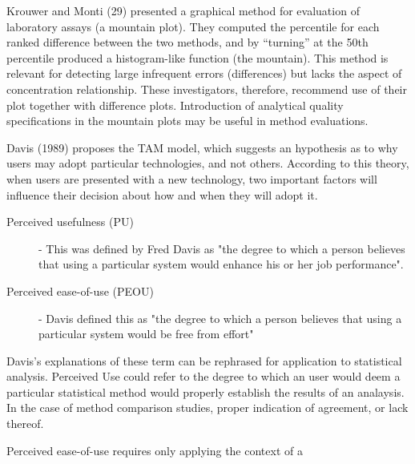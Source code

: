 \documentclass[]{article}
\title{}
\author{}
\begin{document}
\maketitle

\begin{abstract}

\end{abstract}


Krouwer and Monti (29) presented a graphical method for evaluation of laboratory assays (a mountain plot). 
They computed the percentile for each ranked difference between the two methods, and by “turning” at the 50th percentile 
produced a histogram-like function (the mountain). 
This method is relevant for detecting large infrequent errors (differences) but lacks the aspect of concentration relationship. 
These investigators, therefore, recommend use of their plot together with difference plots. 
Introduction of analytical quality specifications in the mountain plots may be useful in method evaluations.




Davis (1989) proposes the TAM model, which suggests an hypothesis as to why users may adopt particular technologies, and not others. 
According to this theory, when users are presented with a new 
technology, two important factors will influence their decision about how and when they will adopt it.
\begin{description}
	\item[Perceived usefulness (PU)] - This was defined by Fred Davis as "the degree to which a person believes that using a particular system would enhance his or her job performance".
	\item[Perceived ease-of-use (PEOU)] - Davis defined this as "the degree to which a person believes that using a particular system would be free from effort" 
\end{description}

Davis's explanations of these term can be rephrased for application to statistical analysis. 
Perceived Use could refer to the degree to which an user would deem a particular statistical method would properly establish the results of an analaysis. In the case of method comparison studies, proper indication of agreement, or lack thereof.

Perceived ease-of-use requires only applying the context of a
\end{document}
